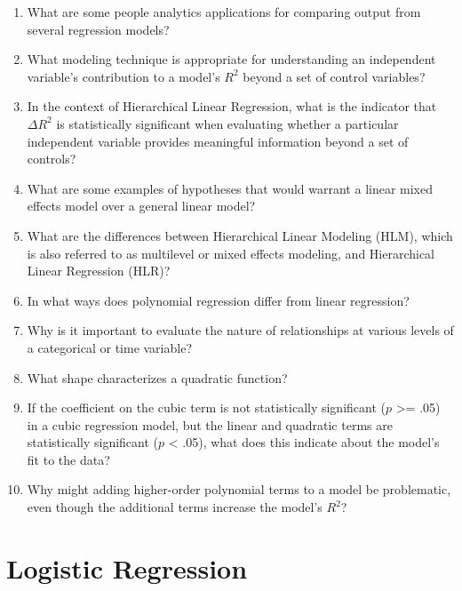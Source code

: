 \documentclass[
]{book}
\begin{document}
\begin{enumerate}
\def\labelenumi{\arabic{enumi}.}
\item
  What are some people analytics applications for comparing output from several regression models?
\item
  What modeling technique is appropriate for understanding an independent variable's contribution to a model's \(R^2\) beyond a set of control variables?
\item
  In the context of Hierarchical Linear Regression, what is the indicator that \(\Delta{R^2}\) is statistically significant when evaluating whether a particular independent variable provides meaningful information beyond a set of controls?
\item
  What are some examples of hypotheses that would warrant a linear mixed effects model over a general linear model?
\item
  What are the differences between Hierarchical Linear Modeling (HLM), which is also referred to as multilevel or mixed effects modeling, and Hierarchical Linear Regression (HLR)?
\item
  In what ways does polynomial regression differ from linear regression?
\item
  Why is it important to evaluate the nature of relationships at various levels of a categorical or time variable?
\item
  What shape characterizes a quadratic function?
\item
  If the coefficient on the cubic term is not statistically significant (\(p\) \textgreater= .05) in a cubic regression model, but the linear and quadratic terms are statistically significant (\(p\) \textless{} .05), what does this indicate about the model's fit to the data?
\item
  Why might adding higher-order polynomial terms to a model be problematic, even though the additional terms increase the model's \(R^2\)?
\end{enumerate}

\hypertarget{log}{%
\chapter{Logistic Regression}\label{log}}
\end{document}
